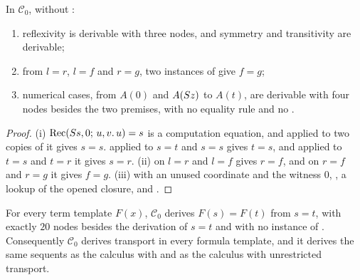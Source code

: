 \begin{lemma}
\label{kern:lem:zccbasic}
In $\mathcal{C}_0$, without :
\begin{enumerate}[label=\textup{(\roman*)}]
\item reflexivity is derivable with three nodes, and symmetry and
 transitivity are derivable;
\item from $l=r$, $l=f$ and $r=g$, two instances of  give
 $f=g$;
\item numerical cases, from $A(0)$ and $A(S z)$ to $A(t)$, are derivable
 with four nodes besides the two premises, with no equality rule and no
 .
\end{enumerate}
\end{lemma}

\begin{proof}
(i) $\operatorname{Rec}(S s,0;\,u,v.\,u)=s$ is a computation equation, and
 applied to two copies of it gives $s=s$.  
applied to $s=t$ and $s=s$ gives $t=s$, and applied to $t=s$ and $t=r$ it
gives $s=r$.  (ii)  on $l=r$ and $l=f$ gives $r=f$, and on
$r=f$ and $r=g$ it gives $f=g$.  (iii)  with an unused
coordinate and the witness $0$, , a lookup of the opened
closure, and .
\end{proof}

\begin{theorem}
\label{kern:thm:zcc}
For every term template $F(x)$, $\mathcal{C}_0$ derives $F(s)=F(t)$ from
$s=t$, with exactly $20$ nodes besides the derivation of $s=t$ and with no
instance of .  Consequently $\mathcal{C}_0$ derives transport
in every formula template, and it derives the same sequents as the calculus
with  and as the calculus with unrestricted transport.
\end{theorem}

